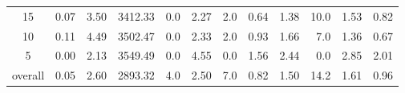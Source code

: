 \begin{table}[H]
\begin{tabular}{c rrrr rr rrr rr}
      15 &           0.07 &        3.50 &    3412.33 &  0.0 &          2.27 &      2.0 &          0.64 &          1.38 &     10.0 &             1.53 & 0.82 \\
      10 &           0.11 &        4.49 &    3502.47 &  0.0 &          2.33 &      2.0 &          0.93 &          1.66 &      7.0 &             1.36 & 0.67 \\
       5 &           0.00 &        2.13 &    3549.49 &  0.0 &          4.55 &      0.0 &          1.56 &          2.44 &      0.0 &             2.85 & 2.01 \\
\midrule
 overall &           0.05 &        2.60 &    2893.32 &  4.0 &          2.50 &      7.0 &          0.82 &          1.50 &     14.2 &             1.61 & 0.96 \\
\bottomrule
\end{tabular}
\end{table}